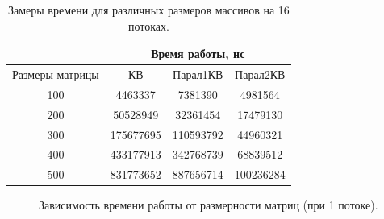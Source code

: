 \documentclass[12pt]{report}
\begin{document}
\begin{table}[h]
	\begin{center}
		\caption{\label{time5} Замеры времени для различных размеров массивов на 16 потоках.}
		\begin{tabular}{|c |c |c |c|} 
 			\hline
 			&\multicolumn{3}{|c|}{Время работы, нс}\\
 			\hline
			Размеры матрицы & КВ & Парал1КВ & Парал2КВ \\ [0.5ex] 
 			\hline\hline
 			100 & 4463337 & 7381390 & 4981564 \\
 			\hline
 			200 & 50528949 & 32361454 &  17479130 \\
 			\hline
			300 & 175677695 & 110593792 & 44960321 \\
			\hline
			400 & 433177913 & 342768739 & 68839512 \\
			\hline
			500 & 831773652 & 887656714 & 100236284 \\
			\hline
			\end{tabular}
	\end{center}
\end{table}
\newpage

\begin{figure}[h]
\begin{center}
	\captionsetup{justification=centering}
	\caption{Зависимость времени работы от размерности матриц (при 1 потоке).}
	\label{timeRes1}
	\end{center}
\end{figure}
\end{document}

